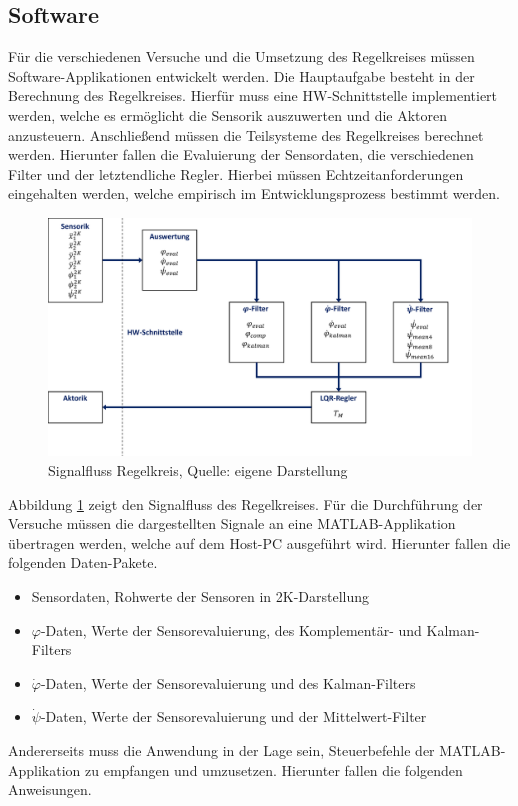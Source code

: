 \subsection{Software}
Für die verschiedenen Versuche und die Umsetzung des Regelkreises müssen Software-Applikationen entwickelt werden. Die Hauptaufgabe besteht in der Berechnung des Regelkreises. Hierfür muss eine HW-Schnittstelle implementiert werden, welche es ermöglicht die Sensorik auszuwerten und die Aktoren anzusteuern. Anschließend müssen die Teilsysteme des Regelkreises berechnet werden. Hierunter fallen die Evaluierung der Sensordaten, die verschiedenen Filter und der letztendliche Regler. Hierbei müssen Echtzeitanforderungen eingehalten werden, welche empirisch im Entwicklungsprozess bestimmt werden.
\begin{figure}[h!]
\centering
\includegraphics[width=0.6\linewidth]{img/SW_signalfluss_regelkreis}
\caption{Signalfluss Regelkreis, Quelle: eigene Darstellung}
\label{img_signalfluss_regelkreis}
\end{figure}
Abbildung \ref{img_signalfluss_regelkreis} zeigt den Signalfluss des Regelkreises. Für die Durchführung der Versuche müssen die dargestellten Signale an eine MATLAB-Applikation übertragen werden, welche auf dem Host-PC ausgeführt wird. Hierunter fallen die folgenden Daten-Pakete.
\begin{itemize}
\setlength\itemsep{0em}
\item Sensordaten, Rohwerte der Sensoren in 2K-Darstellung
\item $\varphi$-Daten, Werte der Sensorevaluierung, des Komplementär- und Kalman-Filters
\item $\dot{\varphi}$-Daten, Werte der Sensorevaluierung und des Kalman-Filters
\item $\dot{\psi}$-Daten, Werte der Sensorevaluierung und der Mittelwert-Filter
\end{itemize}
Andererseits muss die Anwendung in der Lage sein, Steuerbefehle der MATLAB-Applikation zu empfangen und umzusetzen. Hierunter fallen die folgenden Anweisungen.
